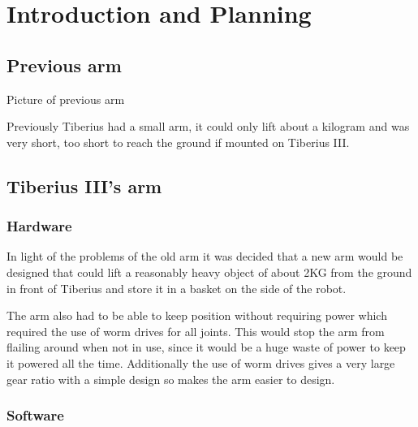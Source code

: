 \section{Introduction and Planning}
\subsection{Previous arm}
Picture of previous arm

Previously Tiberius had a small arm, it could only lift about a kilogram and was very short, too short to reach the ground if mounted on Tiberius III.  
\subsection{Tiberius III's arm}
\subsubsection{Hardware}
In light of the problems of the old arm it was decided that a new arm would be designed that could lift a reasonably heavy object of about 2KG from the ground in front of Tiberius and store it in a basket on the side of the robot.

The arm also had to be able to keep position without requiring power which required the use of worm drives for all joints. This would stop the arm from flailing around when not in use, since it would be a huge waste of power to keep it powered all the time. Additionally the use of worm drives gives a very large gear ratio with a simple design so makes the arm easier to design.

\subsubsection{Software}
